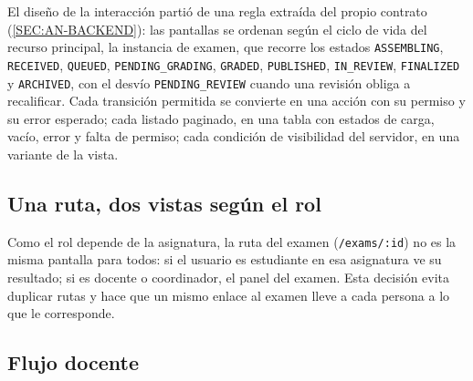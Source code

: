El diseño de la interacción partió de una regla extraída del propio contrato
(\cref{SEC:AN-BACKEND}): las pantallas se ordenan según el ciclo de vida del recurso
principal, la instancia de examen, que recorre los estados \texttt{ASSEMBLING},
\texttt{RECEIVED}, \texttt{QUEUED}, \texttt{PENDING\_GRADING}, \texttt{GRADED},
\texttt{PUBLISHED}, \texttt{IN\_REVIEW}, \texttt{FINALIZED} y \texttt{ARCHIVED}, con el
desvío \texttt{PENDING\_REVIEW} cuando una revisión obliga a recalificar. Cada transición
permitida se convierte en una acción con su permiso y su error esperado; cada listado
paginado, en una tabla con estados de carga, vacío, error y falta de permiso; cada condición
de visibilidad del servidor, en una variante de la vista.

\subsection{Una ruta, dos vistas según el rol}

Como el rol depende de la asignatura, la ruta del examen (\texttt{/exams/:id}) no es la
misma pantalla para todos: si el usuario es estudiante en esa asignatura ve su resultado;
si es docente o coordinador, el panel del examen. Esta decisión evita duplicar rutas y hace
que un mismo enlace al examen lleve a cada persona a lo que le corresponde.

\subsection{Flujo docente}


